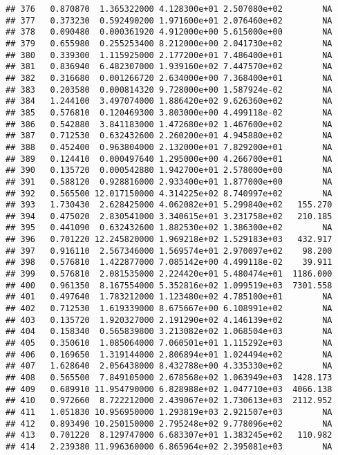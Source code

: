 \documentclass[
]{article}
\begin{document}
\begin{verbatim}
## 376   0.870870  1.365322000 4.128300e+01 2.507080e+02        NA
## 377   0.373230  0.592490200 1.971600e+01 2.076460e+02        NA
## 378   0.090480  0.000361920 4.912000e+00 5.615000e+00        NA
## 379   0.655980  0.255253400 8.212000e+00 2.041730e+02        NA
## 380   0.339300  1.115925000 2.177200e+01 7.486400e+01        NA
## 381   0.836940  6.482307000 1.939160e+02 7.447570e+02        NA
## 382   0.316680  0.001266720 2.634000e+00 7.368400e+01        NA
## 383   0.203580  0.000814320 9.728000e+00 1.587924e-02        NA
## 384   1.244100  3.497074000 1.886420e+02 9.626360e+02        NA
## 385   0.576810  0.120469300 3.803000e+00 4.499118e-02        NA
## 386   0.542880  3.841183000 1.472680e+02 1.467600e+02        NA
## 387   0.712530  0.632432600 2.260200e+01 4.945880e+02        NA
## 388   0.452400  0.963804000 2.132000e+01 7.829200e+01        NA
## 389   0.124410  0.000497640 1.295000e+00 4.266700e+01        NA
## 390   0.135720  0.000542880 1.942700e+01 2.578000e+00        NA
## 391   0.588120  0.928816000 2.933400e+01 1.877000e+00        NA
## 392   0.565500 12.017150000 4.314225e+02 8.740997e+02        NA
## 393   1.730430  2.628425000 4.062082e+01 5.299840e+02   155.270
## 394   0.475020  2.830541000 3.340615e+01 3.231758e+02   210.185
## 395   0.441090  0.632432600 1.882530e+02 1.386300e+02        NA
## 396   0.701220 12.245820000 1.969218e+02 1.529183e+03   432.917
## 397   0.916110  2.567346000 1.569574e+01 2.970097e+02    98.200
## 398   0.576810  1.422877000 7.085142e+00 4.499118e-02    39.911
## 399   0.576810  2.081535000 2.224420e+01 5.480474e+01  1186.000
## 400   0.961350  8.167554000 5.352816e+02 1.099519e+03  7301.558
## 401   0.497640  1.783212000 1.123480e+02 4.785100e+01        NA
## 402   0.712530  1.619339000 8.675667e+00 6.108991e+02        NA
## 403   0.135720  1.920327000 2.191290e+02 4.146139e+02        NA
## 404   0.158340  0.565839800 3.213082e+02 1.068504e+03        NA
## 405   0.350610  1.085064000 7.060501e+01 1.115292e+03        NA
## 406   0.169650  1.319144000 2.806894e+01 1.024494e+02        NA
## 407   1.628640  2.056438000 8.432788e+00 4.335330e+02        NA
## 408   0.565500  7.849105000 2.678568e+02 1.063949e+03  1428.173
## 409   0.689910 11.954790000 6.828988e+02 1.047710e+03  4066.138
## 410   0.972660  8.722212000 2.439067e+02 1.730613e+03  2112.952
## 411   1.051830 10.956950000 1.293819e+03 2.921507e+03        NA
## 412   0.893490 10.250150000 2.795248e+02 9.778096e+02        NA
## 413   0.701220  8.129747000 6.683307e+01 1.383245e+02   110.982
## 414   2.239380 11.996360000 6.865964e+02 2.395081e+03        NA

\end{verbatim}
\end{document}
